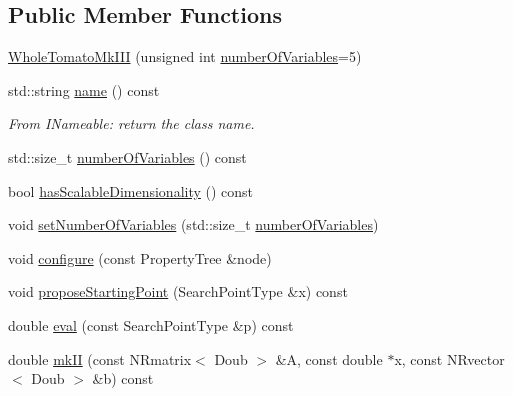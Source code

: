 \subsection*{\-Public \-Member \-Functions}
\begin{DoxyCompactItemize}
\item 
\hyperlink{struct_p_r_p_s_evolution_1_1_models_1_1_whole_tomato_mk_i_i_i_aa4db9e9785e0e7a1f5e6c49ed7c95395}{\-Whole\-Tomato\-Mk\-I\-I\-I} (unsigned int \hyperlink{struct_p_r_p_s_evolution_1_1_models_1_1_whole_tomato_mk_i_i_i_a85792d89d03da848278db64680022b2c}{number\-Of\-Variables}=5)
\item 
std\-::string \hyperlink{struct_p_r_p_s_evolution_1_1_models_1_1_whole_tomato_mk_i_i_i_a42f641b446898c27451a01c273d42c18}{name} () const 
\begin{DoxyCompactList}\small\item\em \-From \-I\-Nameable\-: return the class name. \end{DoxyCompactList}\item 
std\-::size\-\_\-t \hyperlink{struct_p_r_p_s_evolution_1_1_models_1_1_whole_tomato_mk_i_i_i_a85792d89d03da848278db64680022b2c}{number\-Of\-Variables} () const 
\item 
bool \hyperlink{struct_p_r_p_s_evolution_1_1_models_1_1_whole_tomato_mk_i_i_i_aea7e628603370d6277f9e4bebfa52a19}{has\-Scalable\-Dimensionality} () const 
\item 
void \hyperlink{struct_p_r_p_s_evolution_1_1_models_1_1_whole_tomato_mk_i_i_i_a0d7379ad6808d60abfda40888f249d36}{set\-Number\-Of\-Variables} (std\-::size\-\_\-t \hyperlink{struct_p_r_p_s_evolution_1_1_models_1_1_whole_tomato_mk_i_i_i_a85792d89d03da848278db64680022b2c}{number\-Of\-Variables})
\item 
void \hyperlink{struct_p_r_p_s_evolution_1_1_models_1_1_whole_tomato_mk_i_i_i_acdd9aa0db9d1925887b63d71f3d0690c}{configure} (const \-Property\-Tree \&node)
\item 
void \hyperlink{struct_p_r_p_s_evolution_1_1_models_1_1_whole_tomato_mk_i_i_i_ab8a4380846b7dbc3863c355a0d34607c}{propose\-Starting\-Point} (\-Search\-Point\-Type \&x) const 
\item 
double \hyperlink{struct_p_r_p_s_evolution_1_1_models_1_1_whole_tomato_mk_i_i_i_ab4685d9e0ead2a4d8f7508c768d6bb1d}{eval} (const \-Search\-Point\-Type \&p) const 
\item 
double \hyperlink{struct_p_r_p_s_evolution_1_1_models_1_1_whole_tomato_mk_i_i_i_a200ad3b00ced958f70cbcfff6c30538e}{mk\-I\-I} (const \-N\-Rmatrix$<$ \-Doub $>$ \&\-A, const double $\ast$x, const \-N\-Rvector$<$ \-Doub $>$ \&b) const 

\end{DoxyCompactItemize}
